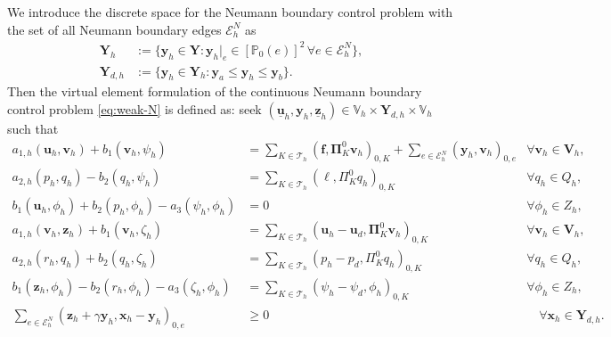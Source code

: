 \documentclass[smallextended]{svjour3}
\numberwithin{equation}{section}
\numberwithin{figure}{section}
\numberwithin{table}{section}
\newcommand\bV{\mathbf{V}}
\newcommand\bPi{\boldsymbol{\Pi}}
\newcommand\ff{\boldsymbol{f}}
\newcommand\buu{\underline{\boldsymbol{u}}}
\newcommand\buz{\underline{\boldsymbol{z}}}
\newcommand\bx{\boldsymbol{x}}
\newcommand\by{\boldsymbol{y}}
\newcommand\bu{\boldsymbol{u}}
\newcommand\bv{\boldsymbol{v}}
\newcommand\bz{\boldsymbol{z}}
\newcommand{\bYd}{\boldsymbol{Y}_d}
\newcommand{\bY}{\boldsymbol{Y}}
\newcommand\cT{\mathcal{T}}
\newcommand{\bbV}{\mathbb{V}}
\newcommand{\bbP}{\mathbb{P}}
\begin{document}
We introduce the discrete space for the Neumann boundary control problem with the set of all Neumann boundary edges $\mathcal{E}_h^N$ as
    \begin{align*}
		\bY_h &:= \lbrace \by_h \in \bY: \by_h |_e \in [\bbP_0(e)]^2 \, \forall e \in  \mathcal{E}_h^N \rbrace, \\
        \bY_{d,h} & := \lbrace \by_h \in \bY_h: \by_a \le \by_h \le \by_b \rbrace.
	\end{align*}
    Then the virtual element formulation of the continuous Neumann boundary control problem \eqref{eq:weak-N} is defined as: seek $(\buu_h, \by_h, \buz_h) \in \bbV_h \times \bY_{d,h} \times \bbV_h$
	such that
	\begin{subequations} \label{eq:weak-h-N}
		\begin{align}
			a_{1,h}(\bu_h, \bv_h) + b_1(\bv_h, \psi_h) &=  \sum_{K \in \cT_h} ( \ff, \bPi^{0}_K \bv_h )_{0, K}  + \sum_{e \in \mathcal{E}_h^N} (\by_h, \bv_h )_{0, e}    & \forall \bv_h \in \bV_h, \label{eq:weak-h-N-a}\\
			a_{2,h}(p_h, q_h) - b_2(q_h, \psi_h) & = \sum_{K \in \cT_h} ( \ell, \Pi^{0}_K q_h )_{0, K}  & \forall q_h \in Q_h, \label{eq:weak-h-N-b}\\
			b_1(\bu_h, \phi_h) + b_2(p_h, \phi_h) - a_3(\psi_h, \phi_h) & =0  & \forall \phi_h \in Z_h, \label{eq:weak-h-N-c}\\
			a_{1,h}(\bv_h, \bz_h) + b_1(\bv_h, \zeta_h) &= \sum_{K \in \cT_h} ( \bu_h - \bu_d, \bPi^{0}_K \bv_h)_{0, K}   & \forall \bv_h \in \bV_h, \label{eq:weak-h-N-d} \\
			a_{2,h}(r_h, q_h) + b_2(q_h, \zeta_h) & = \sum_{K \in \cT_h} (p_h - p_d, \Pi^{0}_K  q_h)_{0, K}  & \forall q_h \in Q_h, \label{eq:weak-h-N-e} \\
			b_1(\bz_h, \phi_h) - b_2(r_h, \phi_h) - a_3(\zeta_h, \phi_h) & =\sum_{K \in \cT_h} (\psi_h - \psi_d,  \phi_h)_{0, K} \,\, & \forall \phi_h \in Z_h, \label{eq:weak-h-N-f} \\
			\sum_{e \in \mathcal{E}_h^N} (\bz_h + \gamma \by_h, \bx_h - \by_h )_{0,e} & \ge  0 &\quad \forall \bx_h \in \bY_{d,h}.  \label{eq:optimality-h-N}
		\end{align}
	\end{subequations}
\end{document}
